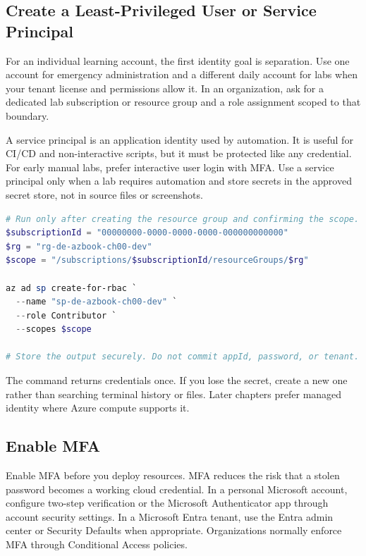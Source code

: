 \subsection{Create a Least-Privileged User or Service Principal}
For an individual learning account, the first identity goal is separation. Use one account for emergency administration and a different daily account for labs when your tenant license and permissions allow it. In an organization, ask for a dedicated lab subscription or resource group and a role assignment scoped to that boundary.

A service principal is an application identity used by automation. It is useful for CI/CD and non-interactive scripts, but it must be protected like any credential. For early manual labs, prefer interactive user login with MFA. Use a service principal only when a lab requires automation and store secrets in the approved secret store, not in source files or screenshots.

\begin{lstlisting}[language=PowerShell,caption={Creating a resource-group scoped service principal with Azure CLI from PowerShell.},label={lst:create-sp-rg-scope}]
# Run only after creating the resource group and confirming the scope.
$subscriptionId = "00000000-0000-0000-0000-000000000000"
$rg = "rg-de-azbook-ch00-dev"
$scope = "/subscriptions/$subscriptionId/resourceGroups/$rg"

az ad sp create-for-rbac `
  --name "sp-de-azbook-ch00-dev" `
  --role Contributor `
  --scopes $scope

# Store the output securely. Do not commit appId, password, or tenant.
\end{lstlisting}

The command returns credentials once. If you lose the secret, create a new one rather than searching terminal history or files. Later chapters prefer managed identity where Azure compute supports it.

\subsection{Enable MFA}
Enable MFA before you deploy resources. MFA reduces the risk that a stolen password becomes a working cloud credential. In a personal Microsoft account, configure two-step verification or the Microsoft Authenticator app through account security settings. In a Microsoft Entra tenant, use the Entra admin center or Security Defaults when appropriate. Organizations normally enforce MFA through Conditional Access policies.

